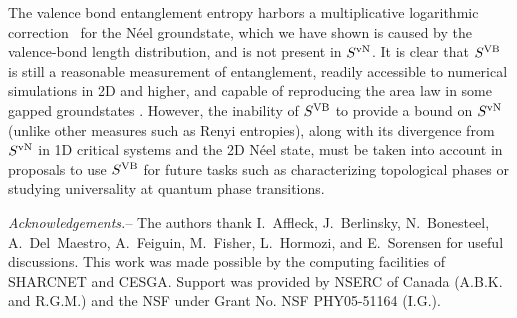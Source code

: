 \documentclass[prl,aps,twocolumn,floatfix,amsmath,amssymb,superscriptaddress,tightenlines]{revtex4}
\begin{document}
The valence bond entanglement entropy harbors a multiplicative logarithmic
correction~\cite{Alet,Chh} for the N\'eel groundstate, which we have shown
is caused by the valence-bond length distribution, and is not present in
$S^{\rm vN}$.  It is clear that $S^{\rm VB}$ is still a reasonable
measurement of entanglement, readily accessible to numerical simulations
in 2D and higher, and capable of reproducing the area law in some gapped
groundstates \cite{Alet,Chh}.  However, the inability of  $S^{\rm VB}$ to
provide a bound on $S^{\rm vN}$ (unlike other measures such as Renyi
entropies), along with its divergence from $S^{\rm vN}$ in 1D critical
systems and the 2D N\'eel state, must be taken into account in proposals
to use $S^{\rm VB}$ for
future tasks such as characterizing topological phases or studying
universality at quantum phase transitions.


{\it Acknowledgements.}-- The authors thank I.~Affleck, J.~Berlinsky,
N.~Bonesteel, A.~Del~Maestro, A.~Feiguin, 
M.~Fisher, L.~Hormozi, and E.~Sorensen 
for useful discussions.  This work was made possible by the
computing facilities of SHARCNET and CESGA.  Support was provided by NSERC
of Canada (A.B.K. and R.G.M.) and the NSF under Grant No. NSF PHY05-51164
(I.G.).


\end{document}
